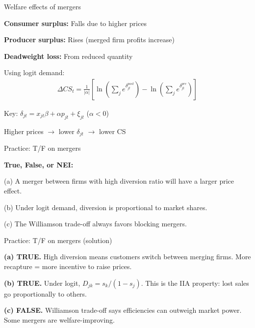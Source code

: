 \documentclass[notes,11pt, aspectratio=169]{beamer}
\newenvironment{wideitemize}{\itemize\addtolength{\itemsep}{10pt}}{\enditemize}
\begin{document}
\begin{frame}{Welfare effects of mergers}
	\begin{wideitemize}
		\item \textbf{Consumer surplus:} Falls due to higher prices
		\item \textbf{Producer surplus:} Rises (merged firm profits increase)
		\item \textbf{Deadweight loss:} From reduced quantity
		\item Using logit demand:
		\begin{align*}
			\Delta CS_t = \frac{1}{|\alpha|}\left[\ln\left(\sum_j e^{\delta_{jt}^{post}}\right) - \ln\left(\sum_j e^{\delta_{jt}^{pre}}\right)\right]
		\end{align*}
		\item Key: $\delta_{jt} = x_{jt}\beta + \alpha p_{jt} + \xi_{jt}$ \quad ($\alpha < 0$)
		\item Higher prices $\rightarrow$ lower $\delta_{jt}$ $\rightarrow$ lower CS
	\end{wideitemize}
\end{frame}

\begin{frame}{Practice: T/F on mergers}
	\begin{wideitemize}
		\item \textbf{True, False, or NEI:}
		\item (a) A merger between firms with high diversion ratio will have a larger price effect.
		\item (b) Under logit demand, diversion is proportional to market shares.
		\item (c) The Williamson trade-off always favors blocking mergers.
	\end{wideitemize}
\end{frame}

\begin{frame}{Practice: T/F on mergers (solution)}
	\begin{wideitemize}
		\item \textbf{(a) TRUE.} High diversion means customers switch between merging firms. More recapture = more incentive to raise prices.
		\item \textbf{(b) TRUE.} Under logit, $D_{jk} = s_k/(1-s_j)$. This is the IIA property: lost sales go proportionally to others.
		\item \textbf{(c) FALSE.} Williamson trade-off says efficiencies can outweigh market power. Some mergers are welfare-improving.
	\end{wideitemize}
\end{frame}
\end{document}
